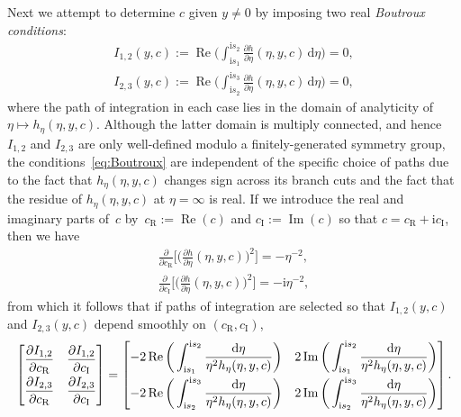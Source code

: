 \documentclass[pdftex]{sigma}
\numberwithin{equation}{section}
\begin{document}
Next we attempt to determine $c$ given $y\neq 0$ by imposing two real \emph{Boutroux conditions}:
\begin{gather}
I_{1,2}(y,c):=\operatorname{Re}\bigg(\int_{\mathrm{i} s_1}^{\mathrm{i} s_2}\frac{\partial h}{\partial \eta}(\eta,y,c)\,\mathrm{d}\eta\bigg)=0,\nonumber\\
I_{2,3}(y,c):=\operatorname{Re}\bigg(\int_{\mathrm{i} s_2}^{\mathrm{i} s_3}\frac{\partial h}{\partial\eta}(\eta,y,c)\,\mathrm{d}\eta\bigg)=0,
\label{eq:Boutroux}
\end{gather}
where the path of integration in each case lies in the domain of analyticity of $\eta\mapsto h_\eta(\eta,y,c)$. Although the latter domain is multiply connected, and hence $I_{1,2}$ and $I_{2,3}$ are only well-defined modulo a finitely-generated symmetry group, the conditions~\eqref{eq:Boutroux} are independent of the specific choice of paths due to the fact that $h_\eta(\eta,y,c)$ changes sign across its branch cuts and the fact that the residue of $h_\eta(\eta,y,c)$ at $\eta=\infty$ is real. If we introduce the real and imaginary parts of~$c$ by~$c_\mathrm{R}:=\operatorname{Re}(c)$ and $c_\mathrm{I}:=\operatorname{Im}(c)$ so that $c=c_\mathrm{R}+\mathrm{i} c_\mathrm{I}$, then we have
\begin{gather*}
\frac{\partial}{\partial c_\mathrm{R}}\bigg[\bigg(\frac{\partial h}{\partial\eta}(\eta,y,c)\bigg)^2\bigg] = -\eta^{-2},\\
\frac{\partial}{\partial c_\mathrm{I}}\bigg[\bigg(\frac{\partial h}{\partial\eta}(\eta,y,c)\bigg)^2\bigg] = -\mathrm{i}\eta^{-2},
\end{gather*}
from which it follows that if paths of integration are selected so that $I_{1,2}(y,c)$ and $I_{2,3}(y,c)$ depend smoothly on $(c_\mathrm{R},c_\mathrm{I})$,
\begin{equation*}
\begin{bmatrix}
\dfrac{\partial I_{1,2}}{\partial c_\mathrm{R}} & \dfrac{\partial I_{1,2}}{\partial c_\mathrm{I}}\vspace{1mm}\\
\dfrac{\partial I_{2,3}}{\partial c_\mathrm{R}} & \dfrac{\partial I_{2,3}}{\partial c_\mathrm{I}}
\end{bmatrix} =
\begin{bmatrix}
\displaystyle
-2\operatorname{Re}\bigg(\int_{\mathrm{i} s_1}^{\mathrm{i} s_2}\frac{\mathrm{d}\eta}{\eta^2h_\eta(\eta,y,c)}\bigg) & \displaystyle 2\operatorname{Im}\bigg(\int_{\mathrm{i} s_1}^{\mathrm{i} s_2}\frac{\mathrm{d}\eta}{\eta^2h_\eta(\eta,y,c)}\bigg)\vspace{1mm}\\
\displaystyle
-2\operatorname{Re}\bigg(\int_{\mathrm{i} s_2}^{\mathrm{i} s_3}\frac{\mathrm{d}\eta}{\eta^2h_\eta(\eta,y,c)}\bigg) & \displaystyle 2\operatorname{Im}\bigg(\int_{\mathrm{i} s_2}^{\mathrm{i} s_3}\frac{\mathrm{d}\eta}{\eta^2h_\eta(\eta,y,c)}\bigg)
\end{bmatrix}.
\end{equation*}
\end{document}
